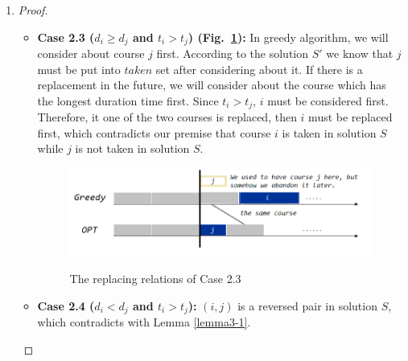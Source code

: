 \documentclass[12pt,a4paper]{article}
\makeatletter
\newtheorem*{solution}{Solution}
\theoremstyle{definition}
\renewenvironment{solution}[1][Solution] {\par\pushQED{\qed}\normalfont\topsep6\p@\@plus6\p@\relax\trivlist\item[\hskip\labelsep\bfseries#1\@addpunct{.}]\ignorespaces}{\popQED\endtrivlist\@endpefalse} \makeatother
\makeatother
\begin{document}
\begin{enumerate}
\begin{solution}
\begin{proof}
\begin{itemize}
\begin{itemize}
            \item \textbf{Case 2.3 ($d_i \geq d_j$ and $t_i > t_j$) (Fig.~\ref{fig23}):} In greedy algorithm, we will consider about course $j$ first. According to the solution $S'$ we know that $j$ must be put
            into $taken$ set after considering about it. If there is a replacement in the future, we will consider about the course which has the longest duration time first.
            Since $t_i > t_j$, $i$ must be considered first. Therefore, it one of the two courses is replaced, then $i$ must be replaced first, which contradicts our premise
            that course $i$ is taken in solution $S$ while $j$ is not taken in solution $S$.
            \begin{figure}[h]
            \centering
            \includegraphics[width=4.2in]{problem3-case2-3.png}\\
            \caption{The replacing relations of Case 2.3}\label{fig23}
            \end{figure}
            \item \textbf{Case 2.4 ($d_i < d_j$ and $t_i > t_j$):} $(i, j)$ is a reversed pair in solution $S$, which contradicts with Lemma \ref{lemma3-1}.


\end{itemize}
\end{itemize}
\end{proof}
\end{solution}
\end{enumerate}
\end{document}
